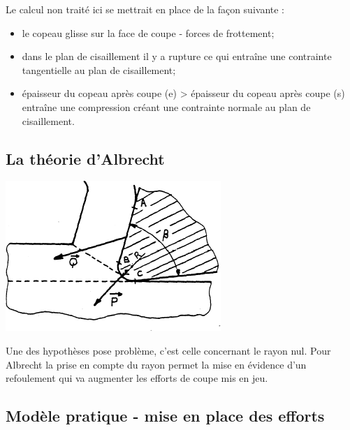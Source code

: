 \documentclass[11pt,oneside]{article}
\begin{document}
 Le calcul non traité ici se mettrait en place de la façon suivante :
\begin{itemize}
\item le copeau glisse sur la face de coupe - forces de frottement;
\item dans le plan de cisaillement il y a rupture ce qui entraîne une contrainte tangentielle au plan de cisaillement;
\item épaisseur du copeau après coupe (e) > épaisseur du copeau après coupe (s) entraîne une compression créant une contrainte normale au plan de cisaillement.
\end{itemize}



\subsection{La théorie d'Albrecht}

\noindent \begin{minipage}[c]{.45\linewidth}
\begin{center}
\includegraphics[width=\textwidth]{png/fig_23}
\end{center}
\end{minipage}\hfill
\begin{minipage}[c]{.45\linewidth}

Une des hypothèses pose problème, c'est celle concernant le rayon nul. Pour Albrecht la prise en compte du rayon permet la mise en évidence d'un refoulement qui va augmenter les efforts de coupe mis en jeu.
\end{minipage}

\subsection{Modèle pratique - mise en place des efforts}
\end{document}
